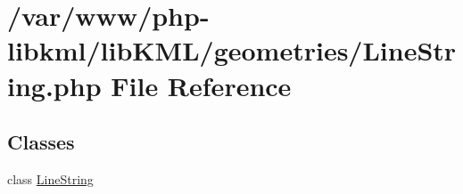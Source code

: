 \hypertarget{LineString_8php}{
\section{/var/www/php-\/libkml/libKML/geometries/LineString.php File Reference}
\label{de/d98/LineString_8php}
}
\subsection*{Classes}
\begin{DoxyCompactItemize}
\item 
class \hyperlink{classLineString}{LineString}
\end{DoxyCompactItemize}
